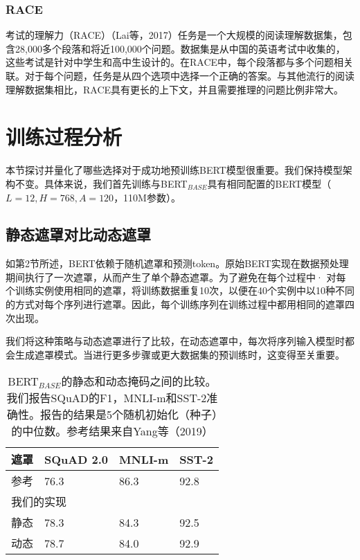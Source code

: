 \documentclass[lang=cn,11pt,a4paper,twocolumn]{elegantpaper}
\begin{document}
\subsubsection{RACE}
考试的理解力（RACE）（Lai等，2017）任务是一个大规模的阅读理解数据集，包含28,000多个段落和将近100,000个问题。数据集是从中国的英语考试中收集的，这些考试是针对中学生和高中生设计的。在RACE中，每个段落都与多个问题相关联。对于每个问题，任务是从四个选项中选择一个正确的答案。与其他流行的阅读理解数据集相比，RACE具有更长的上下文，并且需要推理的问题比例非常大。
\section{训练过程分析}
本节探讨并量化了哪些选择对于成功地预训练BERT模型很重要。我们保持模型架构不变。具体来说，我们首先训练与BERT$_{BASE}$具有相同配置的BERT模型（$L = 12,H = 768,A = 120$，110M参数）。
\subsection{静态遮罩对比动态遮罩}
如第2节所述，BERT依赖于随机遮罩和预测token。原始BERT实现在数据预处理期间执行了一次遮罩，从而产生了单个静态遮罩。为了避免在每个过程中· 对每个训练实例使用相同的遮罩，将训练数据重复10次，以便在40个实例中以10种不同的方式对每个序列进行遮罩。因此，每个训练序列在训练过程中都用相同的遮罩四次出现。

我们将这种策略与动态遮罩进行了比较，在动态遮罩中，每次将序列输入模型时都会生成遮罩模式。当进行更多步骤或更大数据集的预训练时，这变得至关重要。

\begin{table}[]
  \centering

  \begin{tabular}{llll}
  \hline
  遮罩 & \textbf{SQuAD 2.0} & \textbf{MNLI-m} & \textbf{SST-2} \\ \hline
  参考 & 76.3               & 86.3            & 92.8           \\ \hline
  \multicolumn{4}{l}{我们的实现}                                \\ 
  静态 & 78.3               & 84.3            & 92.5           \\ 
  动态 & 78.7               & 84.0            & 92.9           \\ \hline
  \end{tabular}
  \caption{BERT$_{BASE}$的静态和动态掩码之间的比较。我们报告SQuAD的F1，MNLI-m和SST-2准确性。报告的结果是5个随机初始化（种子）的中位数。参考结果来自Yang等（2019）}
  \end{table}
\end{document}
